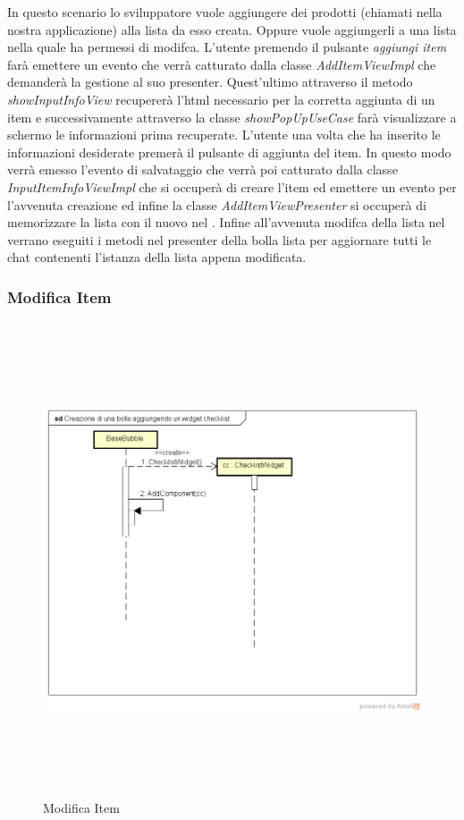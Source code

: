 In questo scenario lo sviluppatore vuole aggiungere dei prodotti (chiamati  nella nostra applicazione) alla lista da esso creata. Oppure vuole aggiungerli a una lista nella quale ha permessi di modifca. L'utente premendo il pulsante \textit{aggiungi item} farà emettere un evento che verrà catturato dalla classe \textit{AddItemViewImpl} che demanderà la gestione al suo presenter. Quest'ultimo attraverso il metodo \textit{showInputInfoView} recupererà l'html necessario per la corretta aggiunta di un item e successivamente attraverso la classe \textit{showPopUpUseCase} farà visualizzare a schermo le informazioni prima recuperate. L'utente una volta che ha inserito le informazioni desiderate premerà il pulsante di aggiunta del item. In questo modo verrà emesso l'evento di salvataggio che verrà poi catturato dalla classe \textit{InputItemInfoViewImpl} che si occuperà di creare l'item ed emettere un evento per l'avvenuta creazione ed infine la classe \textit{AddItemViewPresenter} si occuperà di memorizzare la  lista con il nuovo  nel . Infine all'avvenuta modifca della lista nel  verrano eseguiti i metodi nel presenter della bolla lista per aggiornare tutti le chat contenenti l'istanza della lista appena modificata. 




\subsubsection{Modifica Item}

\label{Modifica Item}
\begin{figure}[H]
	\centering
	\includegraphics[width=16cm, height=14cm]{Sezioni/Diagrammi/img/Creazione di una bolla aggiungendo un widget checklist.png}
	\caption{Modifica Item}
\end{figure}


